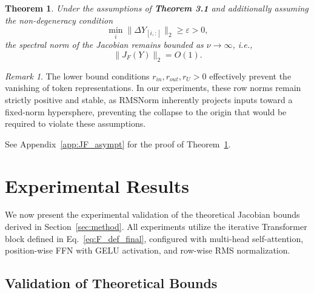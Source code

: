 \documentclass{zapiski}
\theoremstyle{plain}
\newtheorem{theorem}{Theorem}[section]
\theoremstyle{definition}
\theoremstyle{remark}
\newtheorem*{remark}{Remark}
\DeclareMathOperator{\FFN}{FFN}
\DeclareMathOperator{\MSA}{MSA}
\begin{document}
\begin{theorem}
\label{thm:JF_asympt}
Under the assumptions of \textbf{Theorem 3.1} and additionally assuming the non-degeneracy condition
\begin{equation}
\min_i \| \Delta Y_{[i,:]}\|_2 \ge \varepsilon > 0,
\end{equation}
the spectral norm of the Jacobian remains bounded as $\nu \to \infty$, i.e.,
\[
\|J_F(Y)\|_2 = O(1).
\]
\end{theorem}

\begin{remark}
The lower bound conditions $r_{in}, r_{out}, r_U > 0$ effectively prevent the vanishing of token representations. In our experiments, these row norms remain strictly positive and stable, as RMSNorm inherently projects inputs toward a fixed-norm hypersphere, preventing the collapse to the origin that would be required to violate these assumptions.
\end{remark}

See Appendix~\ref{app:JF_asympt} for the proof of Theorem~\ref{thm:JF_asympt}.

\section{Experimental Results}
\label{sec:results}

We now present the experimental validation of the theoretical Jacobian bounds derived in Section~\ref{sec:method}.
All experiments utilize the iterative Transformer block defined in Eq.~\eqref{eq:F_def_final}, configured with multi-head self-attention,
position-wise FFN with GELU activation, and row-wise RMS normalization.

\subsection{Validation of Theoretical Bounds}
\label{ssec:exp_bounds}

\end{document}
